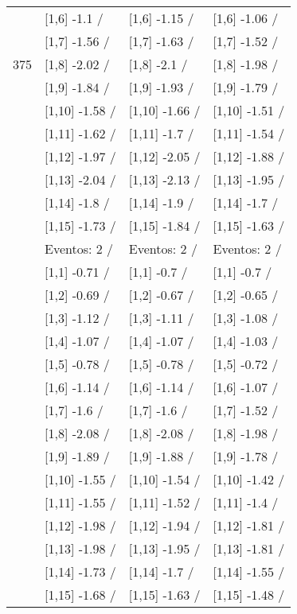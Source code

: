 \begin{table}
\begin{tabular}[t]{llll}
 & {}[1,6] -1.1  / & {}[1,6] -1.15  / & {}[1,6] -1.06  /\\
 & {}[1,7] -1.56  / & {}[1,7] -1.63  / & {}[1,7] -1.52  /\\
375 & {}[1,8] -2.02  / & {}[1,8] -2.1  / & {}[1,8] -1.98  /\\
\addlinespace
 & {}[1,9] -1.84  / & {}[1,9] -1.93  / & {}[1,9] -1.79  /\\
 & {}[1,10] -1.58  / & {}[1,10] -1.66  / & {}[1,10] -1.51  /\\
 & {}[1,11] -1.62  / & {}[1,11] -1.7  / & {}[1,11] -1.54  /\\
 & {}[1,12] -1.97  / & {}[1,12] -2.05  / & {}[1,12] -1.88  /\\
 & {}[1,13] -2.04  / & {}[1,13] -2.13  / & {}[1,13] -1.95  /\\
\addlinespace
 & {}[1,14] -1.8  / & {}[1,14] -1.9  / & {}[1,14] -1.7  /\\
 & {}[1,15] -1.73  / & {}[1,15] -1.84  / & {}[1,15] -1.63  /\\
 & Eventos:  2 / & Eventos:  2 / & Eventos:  2 /\\
 & {}[1,1] -0.71  / & {}[1,1] -0.7  / & {}[1,1] -0.7  /\\
 & {}[1,2] -0.69  / & {}[1,2] -0.67  / & {}[1,2] -0.65  /\\
\addlinespace
 & {}[1,3] -1.12  / & {}[1,3] -1.11  / & {}[1,3] -1.08  /\\
 & {}[1,4] -1.07  / & {}[1,4] -1.07  / & {}[1,4] -1.03  /\\
 & {}[1,5] -0.78  / & {}[1,5] -0.78  / & {}[1,5] -0.72  /\\
 & {}[1,6] -1.14  / & {}[1,6] -1.14  / & {}[1,6] -1.07  /\\
 & {}[1,7] -1.6  / & {}[1,7] -1.6  / & {}[1,7] -1.52  /\\
\addlinespace
500 & {}[1,8] -2.08  / & {}[1,8] -2.08  / & {}[1,8] -1.98  /\\
 & {}[1,9] -1.89  / & {}[1,9] -1.88  / & {}[1,9] -1.78  /\\
 & {}[1,10] -1.55  / & {}[1,10] -1.54  / & {}[1,10] -1.42  /\\
 & {}[1,11] -1.55  / & {}[1,11] -1.52  / & {}[1,11] -1.4  /\\
 & {}[1,12] -1.98  / & {}[1,12] -1.94  / & {}[1,12] -1.81  /\\
\addlinespace
 & {}[1,13] -1.98  / & {}[1,13] -1.95  / & {}[1,13] -1.81  /\\
 & {}[1,14] -1.73  / & {}[1,14] -1.7  / & {}[1,14] -1.55  /\\
 & {}[1,15] -1.68  / & {}[1,15] -1.63  / & {}[1,15] -1.48  /\\
\bottomrule
\end{tabular}
\end{table}
